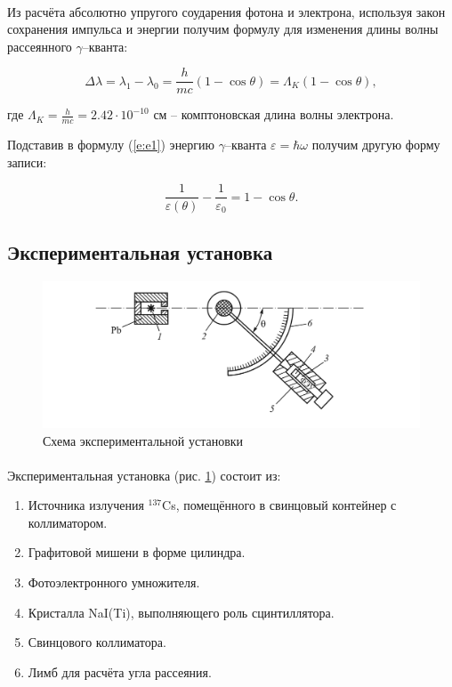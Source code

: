 \documentclass[a4paper,12pt]{article} %
\begin{document}
\paragraph{} Из расчёта абсолютно упругого соударения фотона и электрона, используя закон сохранения импульса и энергии получим формулу для изменения длины волны рассеянного $\gamma$--кванта:

\begin{equation}
\Delta \lambda = \lambda_1 - \lambda_0 = \frac{h}{mc}(1 - \cos{\theta}) = \Lambda_{K}(1 - \cos{\theta}), 
\label{e:e1}
\end{equation}

\noindent где $\Lambda_{K} = \frac{h}{mc} = 2.42 \cdot 10^{-10}$ см -- комптоновская длина волны электрона.

Подставив в формулу (\ref{e:e1}) энергию $\gamma$--кванта $\varepsilon = \hbar \omega$ получим другую форму записи:

\begin{equation}
\frac{1}{\varepsilon(\theta)} - \frac{1}{\varepsilon_0} = 1 - \cos{\theta}.
\label{e:e2}
\end{equation}

\subsection{Экспериментальная установка}

\begin{figure}[h]
\centering
\includegraphics[width=\textwidth]{setup.png}
\caption{Схема экспериментальной установки}
\label{fig:setup}
\end{figure}

\paragraph{} Экспериментальная установка (рис. \ref{fig:setup}) состоит из:
\begin{enumerate}
\itemsep0em
\item Источника излучения $^{137}$Cs, помещённого в свинцовый контейнер с коллиматором.
\item Графитовой мишени в форме цилиндра. 
\item Фотоэлектронного умножителя.
\item Кристалла NaI(Ti), выполняющего роль сцинтиллятора.
\item Свинцового коллиматора.
\item Лимб для расчёта угла рассеяния.
\end{enumerate}
\end{document}
